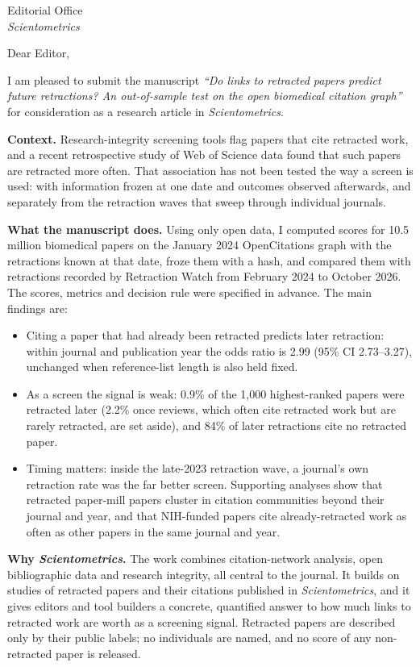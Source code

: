 \documentclass[10pt]{letter}
\date{\today}
\begin{document}
\begin{letter}{Editorial Office\\\emph{Scientometrics}}
\opening{Dear Editor,}

I am pleased to submit the manuscript \emph{``Do links to retracted papers predict future retractions? An
out-of-sample test on the open biomedical citation graph''} for consideration as a research article in
\emph{Scientometrics}.

\textbf{Context.} Research-integrity screening tools flag papers that cite retracted work, and a recent retrospective
study of Web of Science data found that such papers are retracted more often. That association has not been tested
the way a screen is used: with information frozen at one date and outcomes observed afterwards, and separately from
the retraction waves that sweep through individual journals.

\textbf{What the manuscript does.} Using only open data, I computed scores for 10.5 million biomedical papers on the
January 2024 OpenCitations graph with the retractions known at that date, froze them with a hash, and compared them
with retractions recorded by Retraction Watch from February 2024 to October 2026. The scores, metrics and decision
rule were specified in advance. The main findings are:
\begin{itemize}
\item Citing a paper that had already been retracted predicts later retraction: within journal and publication year
  the odds ratio is 2.99 (95\% CI 2.73--3.27), unchanged when reference-list length is also held fixed.
\item As a screen the signal is weak: 0.9\% of the 1,000 highest-ranked papers were retracted later (2.2\% once
  reviews, which often cite retracted work but are rarely retracted, are set aside), and 84\% of later retractions
  cite no retracted paper.
\item Timing matters: inside the late-2023 retraction wave, a journal's own retraction rate was the far better screen.
  Supporting analyses show that retracted paper-mill papers cluster in citation communities beyond their journal and
  year, and that NIH-funded papers cite already-retracted work as often as other papers in the same journal and year.
\end{itemize}

\textbf{Why \emph{Scientometrics}.} The work combines citation-network analysis, open bibliographic data and research
integrity, all central to the journal. It builds on studies of retracted papers and their citations published in
\emph{Scientometrics}, and it gives editors and tool builders a concrete, quantified answer to how much links to
retracted work are worth as a screening signal. Retracted papers are described only by their public labels; no
individuals are named, and no score of any non-retracted paper is released.


\end{letter}
\end{document}
